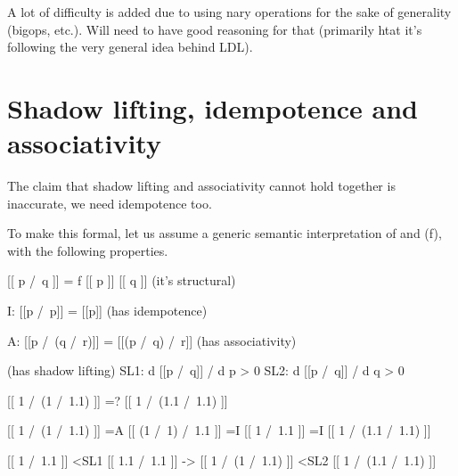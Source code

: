 \documentclass[a4paper,UKenglish,cleveref, autoref, thm-restate]{lipics-v2021}
\begin{document}
A lot of difficulty is added due to using nary operations for the sake of generality (bigops, etc.). Will need to have good reasoning for that (primarily htat it's following the very general idea behind LDL).


\section{Shadow lifting, idempotence and associativity}

The claim that shadow lifting and associativity cannot hold together is inaccurate, we need idempotence too.

To make this formal, let us assume a generic semantic interpretation of and (f), with the following properties.

[[ p /\ q ]] = f [[ p ]]  [[ q ]] (it's structural)

I: [[p /\ p]] = [[p]] (has idempotence)

A: [[p /\ (q /\ r)]] = [[(p /\ q) /\ r]] (has associativity)
 
(has shadow lifting)
SL1: d [[p /\ q]] / d p > 0
SL2: d [[p /\ q]] / d q > 0


[[ 1 /\ (1 /\ 1.1) ]] =? [[ 1 /\ (1.1 /\ 1.1) ]]

[[ 1 /\ (1 /\ 1.1) ]] =A [[ (1 /\ 1) /\ 1.1 ]] =I [[ 1 /\ 1.1 ]] =I [[ 1 /\ (1.1 /\ 1.1) ]]



[[ 1 /\ 1.1 ]] <SL1 [[ 1.1 /\ 1.1 ]]
->
[[ 1 /\ (1 /\ 1.1) ]] <SL2 [[ 1 /\ (1.1 /\ 1.1) ]]






\appendix
\end{document}
